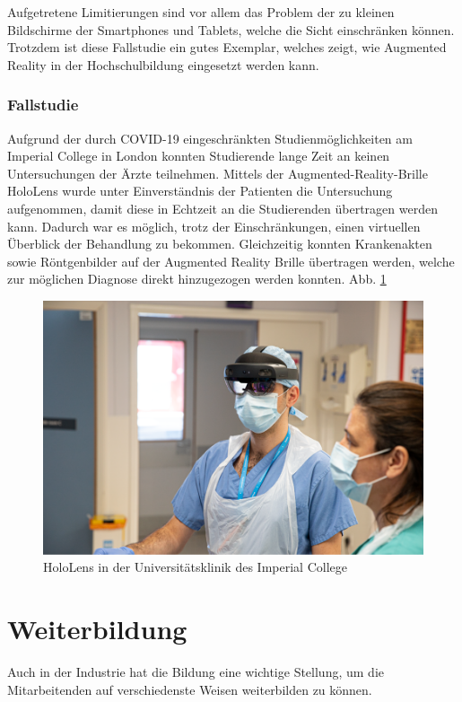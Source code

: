 \documentclass[conference]{IEEEtran}
\begin{document}
Aufgetretene Limitierungen sind vor allem das Problem der zu kleinen Bildschirme der Smartphones und Tablets, welche die Sicht einschränken können. Trotzdem ist diese 
Fallstudie ein gutes Exemplar, welches zeigt, wie Augmented Reality in der Hochschulbildung eingesetzt werden kann.

\subsubsection{Fallstudie}
Aufgrund der durch COVID-19 eingeschränkten Studienmöglichkeiten am Imperial College in London konnten Studierende lange Zeit an keinen Untersuchungen der Ärzte teilnehmen. \cite{w4}
Mittels der Augmented-Reality-Brille HoloLens wurde unter Einverständnis der Patienten die Untersuchung aufgenommen, damit diese in Echtzeit an die Studierenden übertragen werden kann. Dadurch war es möglich, trotz der Einschränkungen, einen virtuellen Überblick der Behandlung zu bekommen. Gleichzeitig konnten Krankenakten sowie Röntgenbilder
auf der Augmented Reality Brille übertragen werden, welche zur möglichen Diagnose direkt hinzugezogen werden konnten. Abb. \ref{fig7}

\begin{figure}[htbp]
    \centerline{\includegraphics[scale=0.2]{img/med.png}}
    \caption{HoloLens in der Universitätsklinik des Imperial College \cite{w4}}
    \label{fig7}
\end{figure}

\section{Weiterbildung}
Auch in der Industrie hat die Bildung eine wichtige Stellung, um die Mitarbeitenden auf verschiedenste Weisen weiterbilden zu können.
\end{document}
